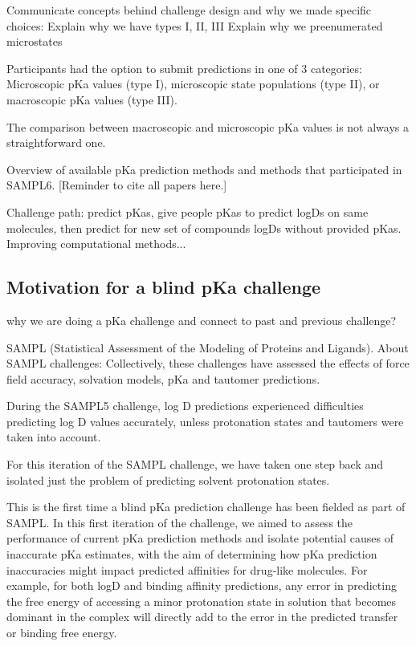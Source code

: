 \documentclass[9pt,lineno,final]{elife}
\begin{document}
Communicate concepts behind challenge design and why we made specific choices:
Explain why we have types I, II, III
Explain why we preenumerated microstates

Participants had the option to submit predictions in one of 3 categories: Microscopic pKa values (type I), microscopic state populations (type II), or macroscopic pKa values (type III).

The comparison between macroscopic and microscopic pKa values is not always a straightforward one. 

Overview of available pKa prediction methods and methods that participated in SAMPL6. [Reminder to cite all papers here.]

Challenge path: predict pKas, give people pKas to predict logDs on same molecules, then predict for new set of compounds logDs without provided pKas.
Improving computational methods...


\subsection{Motivation for a blind pKa challenge}

why we are doing a pKa challenge and connect to past and previous challenge?

SAMPL (Statistical Assessment of the Modeling of Proteins and Ligands). About SAMPL challenges: Collectively, these challenges have assessed the effects of force field accuracy, solvation models, pKa and tautomer predictions.  

During the SAMPL5 challenge, log D predictions experienced difficulties predicting log D values accurately, unless protonation states and tautomers were taken into account.

For this iteration of the SAMPL challenge, we have taken one step back and isolated just the problem of predicting solvent protonation states.

This is the first time a blind pKa prediction challenge has been fielded as part of SAMPL. 
In this first iteration of the challenge, we aimed to assess the performance of current pKa prediction methods and isolate potential causes of inaccurate pKa estimates, with the aim of determining how pKa prediction inaccuracies might impact predicted affinities for drug-like molecules. 
For example, for both logD and binding affinity predictions, any error in predicting the free energy of accessing a minor protonation state in solution that becomes dominant in the complex will directly add to the error in the predicted transfer or binding free energy. 
\end{document}
